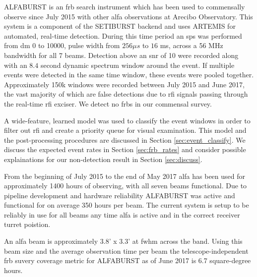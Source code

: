 \documentclass[a4paper,fleqn,usenatbib]{mnras}
\begin{document}
ALFABURST is an \gls*{frb} search instrument which has been used to commensally
observe since July 2015 with other \gls*{alfa} observations at Arecibo
Observatory. This system is a component of the SETIBURST backend
\citep{2017ApJS..228...21C} and uses ARTEMIS \citep{2015MNRAS.452.1254K} for
automated, real-time detection. During this time period an \gls*{sps} was
performed from \gls*{dm} 0 to 10000, pulse width from $256 \mu s$ to $16$ ms,
across a 56 MHz bandwidth for all 7 beams. Detection above an \gls*{snr} of 10
were recorded along with an $8.4$ second dynamic spectrum window around the
event. If multiple events were detected in the same time window, these events
were pooled together.  Approximately 150k windows were recorded between July
2015 and June 2017, the vast majority of which are false detections due to
\gls*{rfi} signals passing through the real-time \gls*{rfi} exciser. We detect
no \glspl*{frb} in our commensal survey.

A wide-feature, learned model was used to classify the event windows in order to
filter out \gls*{rfi} and create a priority queue for visual examination. This
model and the post-processing procedures are discussed in Section
\ref{sec:event_classify}. We discuss the expected event rates in Section
\ref{sec:frb_rates} and consider possible explainations for our non-detection
result in Section \ref{sec:discuss}.


From the beginning of July 2015 to the end of May 2017 \gls*{alfa} has been used
for approximately 1400 hours of observing, with all seven beams functional. Due
to pipeline development and hardware reliability ALFABURST was active and
functional for on average 350 hours per beam.  The current system is setup to be
reliably in use for all beams any time \gls*{alfa} is active and in the correct
receiver turret poistion.

An \gls*{alfa} beam is approximately 3.8' x 3.3' at \gls*{fwhm} across the band.
Using this beam size and the average observation time per beam the
telescope-independent \gls*{frb} suvery coverage metric for ALFABURST as of June
2017 is 6.7 square-degree hours.


\end{document}

